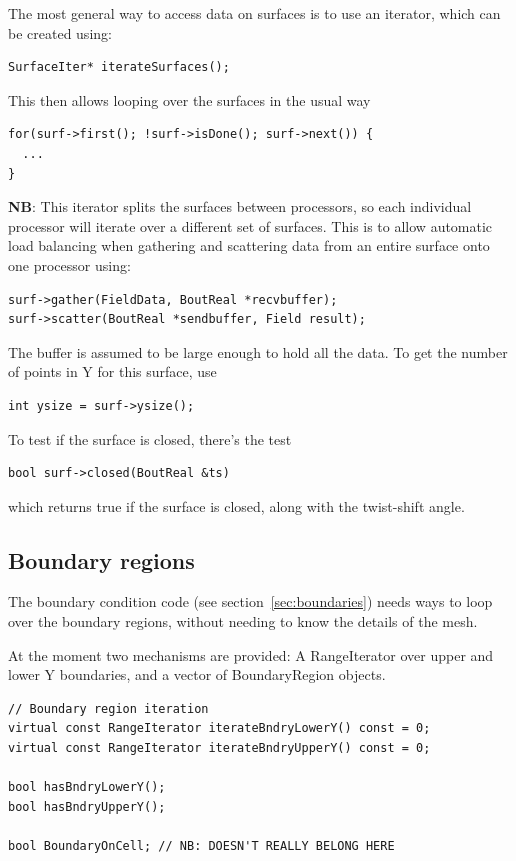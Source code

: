 \documentclass[12pt]{article}
\begin{document}
The most general way to access data on surfaces is to use an
iterator, which can be created using:
\begin{lstlisting}
SurfaceIter* iterateSurfaces();
\end{lstlisting}
This then allows looping over the surfaces in the usual way
\begin{lstlisting}
for(surf->first(); !surf->isDone(); surf->next()) {
  ...
}
\end{lstlisting}
{\bf NB}: This iterator splits the surfaces between processors, so each
individual processor will iterate over a different set of surfaces. This
is to allow automatic load balancing when gathering and scattering data
from an entire surface onto one processor using:
\begin{lstlisting}
surf->gather(FieldData, BoutReal *recvbuffer);
surf->scatter(BoutReal *sendbuffer, Field result);
\end{lstlisting}
The buffer is assumed to be large enough to hold all the data. To 
get the number of points in Y for this surface, use
\begin{lstlisting}
int ysize = surf->ysize();
\end{lstlisting}
To test if the surface is closed, there's the test
\begin{lstlisting}
bool surf->closed(BoutReal &ts)
\end{lstlisting}
which returns true if the surface is closed, along with the twist-shift angle.

\subsection{Boundary regions}

The boundary condition code (see section~\ref{sec:boundaries}) needs
ways to loop over the boundary regions, without needing to know
the details of the mesh.

At the moment two mechanisms are provided: A RangeIterator over upper and lower Y boundaries,
and a vector of BoundaryRegion  objects.

\begin{lstlisting}
// Boundary region iteration
virtual const RangeIterator iterateBndryLowerY() const = 0;
virtual const RangeIterator iterateBndryUpperY() const = 0;

bool hasBndryLowerY();
bool hasBndryUpperY();

bool BoundaryOnCell; // NB: DOESN'T REALLY BELONG HERE
\end{lstlisting}
  
\end{document}
